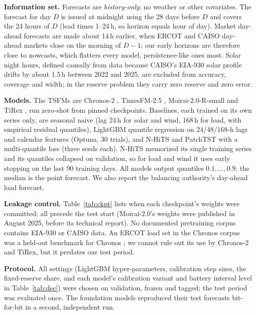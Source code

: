 \documentclass[conference]{IEEEtran}
\begin{document}
\textbf{Information set.} Forecasts are \emph{history-only}: no weather or other covariates. The forecast for day $D$ is issued at midnight using the 28 days before $D$ and covers the 24 hours of $D$ (lead times 1--24\,h, so horizon equals hour of day). Market day-ahead forecasts are made about 14\,h earlier, when ERCOT and CAISO day-ahead markets close on the morning of $D-1$; our early horizons are therefore close to nowcasts, which flatters every model, persistence-like ones most. Solar night hours, defined causally from data because CAISO's EIA-930 solar profile drifts by about 1.5\,h between 2022 and 2025, are excluded from accuracy, coverage and width; in the reserve problem they carry zero reserve and zero error.

\textbf{Models.} The TSFMs are Chronos-2 \cite{ansari2025chronos2}, TimesFM-2.5 \cite{das2024timesfm}, Moirai-2.0-R-small \cite{liu2025moirai2} and TiRex \cite{auer2025tirex}, run zero-shot from pinned checkpoints. Baselines, each trained on its own series only, are seasonal naive (lag 24\,h for solar and wind, 168\,h for load, with empirical residual quantiles), LightGBM quantile regression \cite{ke2017lightgbm} on 24/48/168-h lags and calendar features (Optuna, 30 trials), and N-HiTS \cite{challu2023nhits} and PatchTST \cite{nie2023patchtst} with a multi-quantile loss (three seeds each). N-HiTS memorized its single training series and its quantiles collapsed on validation, so for load and wind it uses early stopping on the last 90 training days. All models output quantiles $0.1,\dots,0.9$; the median is the point forecast. We also report the balancing authority's day-ahead load forecast.

\textbf{Leakage control.} Table~\ref{tab:ckpt} lists when each checkpoint's weights were committed; all precede the test start (Moirai-2.0's weights were published in August 2025, before its technical report). No documented pretraining corpus contains EIA-930 or CAISO data. An ERCOT load set in the Chronos corpus was a held-out benchmark for Chronos \cite{ansari2024chronos}; we cannot rule out its use by Chronos-2 and TiRex, but it predates our test period.

\begin{table}[t]
\caption{Checkpoint dates (weights file at the pinned revision).}
\label{tab:ckpt}
\centering\footnotesize

\end{table}

\textbf{Protocol.} All settings (LightGBM hyper-parameters, calibration step sizes, the fixed-reserve share, and each model's calibration variant and battery interval level in Table~\ref{tab:dec}) were chosen on validation, frozen and tagged; the test period was evaluated once. The foundation models reproduced their test forecasts bit-for-bit in a second, independent run.
\end{document}

